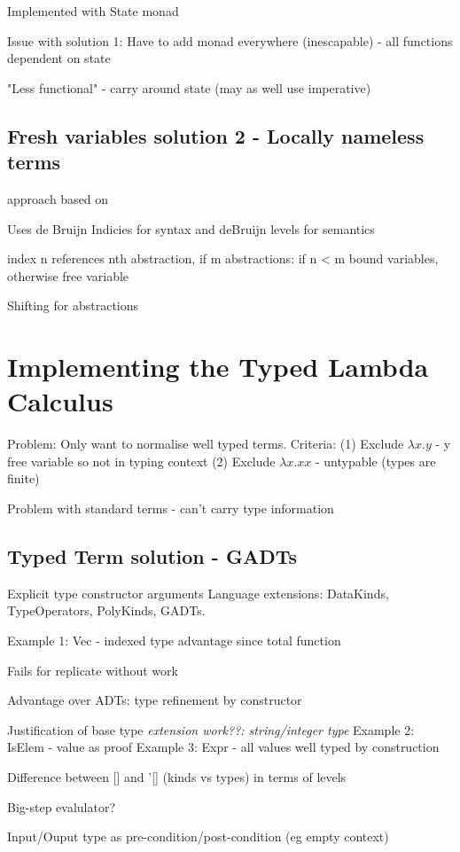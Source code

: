 \documentclass{article}
\begin{document}
Implemented with State monad

Issue with solution 1: Have to add monad everywhere (inescapable) - all functions dependent on state

"Less functional" - carry around state (may as well use imperative)

\subsection{Fresh variables solution 2 - Locally nameless terms}
approach based on \cite{deBruijn}

Uses de Bruijn Indicies for syntax and deBruijn levels for semantics

index n references nth abstraction,
if m abstractions: if n < m bound variables, otherwise free variable

Shifting for abstractions

\section{Implementing the Typed Lambda Calculus}
Problem: Only want to normalise well typed terms.
Criteria: 
(1) Exclude $\lambda x . y$ - y free variable so not in typing context
(2) Exclude $\lambda x.xx$ - untypable (types are finite)

Problem with standard terms - can't carry type information

\subsection{Typed Term solution - GADTs}
\cite{GADTs}
Explicit type constructor arguments
Language extensions:
DataKinds, TypeOperators, PolyKinds, GADTs.

Example 1: Vec - indexed type advantage since total function

Fails for replicate without work \cite{DependentHaskell}

Advantage over ADTs: type refinement by constructor

Justification of base type \textit{extension work??: string/integer type}
Example 2: IsElem - value as proof
Example 3: Expr - all values well typed by construction

Difference between [] and '[] (kinds vs types) in terms of levels

Big-step evalulator?

Input/Ouput type as pre-condition/post-condition (eg empty context)
\end{document}
